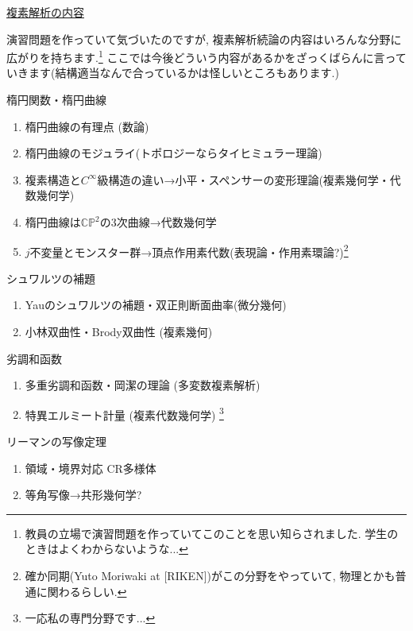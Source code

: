 \documentclass[dvipdfmx,a4paper,11pt]{article}
\theoremstyle{definition}
\begin{document}
\vspace{12pt}
\hspace{-24pt}\underline{複素解析の内容}

演習問題を作っていて気づいたのですが, 複素解析続論の内容はいろんな分野に広がりを持ちます.\footnote{教員の立場で演習問題を作っていてこのことを思い知らされました. 学生のときはよくわからないような...}
ここでは今後どういう内容があるかをざっくばらんに言っていきます(結構適当なんで合っているかは怪しいところもあります.)

\vspace{12pt}
楕円関数・楕円曲線

    \begin{enumerate}
\setlength{\parskip}{0cm} 
  \setlength{\itemsep}{0cm} 
  \item 楕円曲線の有理点 (数論)
  \item 楕円曲線のモジュライ(トポロジーならタイヒミュラー理論) %
  \item 複素構造と$C^\infty$級構造の違い→小平・スペンサーの変形理論(複素幾何学・代数幾何学)
  \item 楕円曲線は$\mathbb{C}\mathbb{P}^2$の3次曲線→代数幾何学
  \item $j$不変量とモンスター群→頂点作用素代数(表現論・作用素環論?)\footnote{確か同期(Yuto Moriwaki at [RIKEN])がこの分野をやっていて, 物理とかも普通に関わるらしい.}
  \end{enumerate}

   
シュワルツの補題
\begin{enumerate}
\setlength{\parskip}{0cm} 
  \setlength{\itemsep}{0cm} 
 \item Yauのシュワルツの補題・双正則断面曲率(微分幾何) %
 \item 小林双曲性・Brody双曲性 (複素幾何)
   \end{enumerate}
   
   劣調和函数
\begin{enumerate}
\setlength{\parskip}{0cm} 
  \setlength{\itemsep}{0cm} 
 \item 多重劣調和函数・岡潔の理論 (多変数複素解析)
 \item 特異エルミート計量 (複素代数幾何学) \footnote{一応私の専門分野です...}
   \end{enumerate}
   
リーマンの写像定理

\begin{enumerate}
\setlength{\parskip}{0cm} 
  \setlength{\itemsep}{0cm} 
  \item 領域・境界対応 CR多様体 
  \item 等角写像→共形幾何学?
   \end{enumerate}
   
\end{document}
